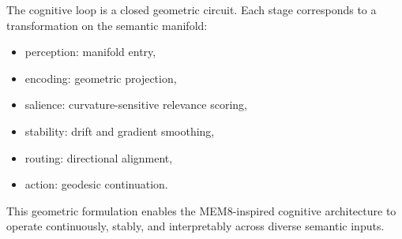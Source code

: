 The cognitive loop is a closed geometric circuit. Each stage corresponds to a
transformation on the semantic manifold:

\begin{itemize}
\item perception: manifold entry,
\item encoding: geometric projection,
\item salience: curvature-sensitive relevance scoring,
\item stability: drift and gradient smoothing,
\item routing: directional alignment,
\item action: geodesic continuation.
\end{itemize}

This geometric formulation enables the MEM8-inspired cognitive architecture to
operate continuously, stably, and interpretably across diverse semantic inputs.
